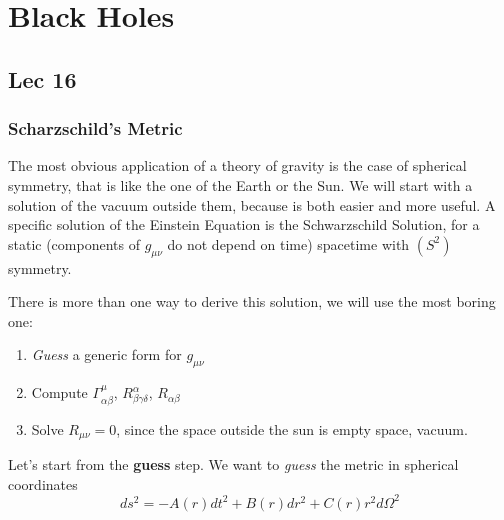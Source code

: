 \chapter{Black Holes}
\section{Lec 16}
\subsection{Scharzschild's Metric}
The most obvious application of a theory of gravity is the case of spherical symmetry, that is like the one of the Earth or the Sun. We will start with a solution of the vacuum outside them, because is both easier and more useful. 
A specific solution of the Einstein Equation is the Schwarzschild Solution, for a static (components of $g_{\mu \nu }$ do not depend on time) spacetime with $\left( S^{2} \right)$ symmetry.\par
There is more than one way to derive this solution, we will use the most boring one:
\begin{enumerate}
\item \emph{Guess} a generic form for $g_{\mu \nu } $
\item Compute $\Gamma ^{\mu }_{\alpha \beta }$, $R^{\alpha }_{\beta \gamma \delta }$, $R_{\alpha \beta }$
\item Solve $R_{\mu \nu } = 0$, since the space outside the sun is empty space, vacuum.
\end{enumerate}

Let's start from the \textbf{guess} step.
We want to \emph{guess} the metric in spherical coordinates 
\begin{equation}\label{eq:polarmetric}
ds^{2}= -A\left( r \right) dt^{2} + B\left( r \right) dr^{2} + C\left( r \right) r^{2}d\Omega ^{2}
\end{equation}

